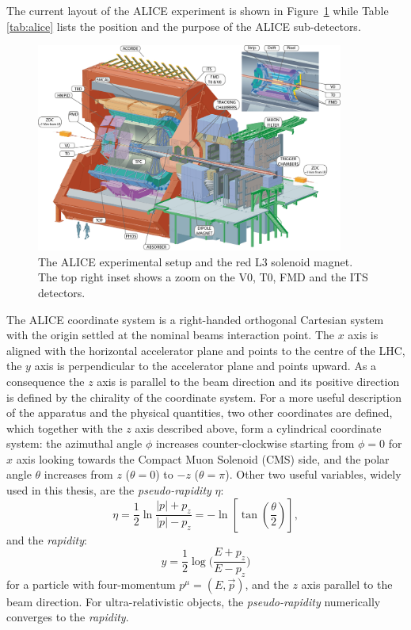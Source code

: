 The current layout of the ALICE experiment is shown in Figure~\ref{fig:alice3D} while Table 
\ref{tab:alice} lists the position and the purpose of the ALICE sub-detectors.
\begin{figure}
    \centering
    \includegraphics[width=0.9\textwidth]{gfx/alice3D}
	\caption{The ALICE experimental setup and the red L3 solenoid magnet. The top right inset shows a zoom on the V0, T0, FMD and the ITS detectors.}
	\label{fig:alice3D}
\end{figure}
The ALICE coordinate system is a right-handed orthogonal Cartesian system with the origin settled at
the nominal beams interaction point.
The $x$ axis is aligned with the horizontal accelerator plane and points to the centre of the LHC,
the $y$ axis is perpendicular to the accelerator plane and points upward.
As a consequence the $z$ axis is parallel to the beam direction and its positive direction is 
defined by the chirality of the coordinate system. 
For a more useful description of the apparatus and the physical quantities, two other coordinates
are defined, which together with the $z$ axis described above, form a cylindrical coordinate system:
the azimuthal angle $\phi$ increases counter-clockwise starting from $\phi = 0$ for $x$ axis looking
towards the Compact Muon Solenoid (CMS) side, and the polar angle $\theta$ increases from $z$ ($\theta=0$) to $-z$ 
($\theta=\pi$).
Other two useful variables, widely used in this thesis, are the \textit{pseudo-rapidity} $\eta$:
\begin{equation}
    \eta = \frac{1}{2} \ln \frac{|p| + p_{z}}{|p| - p_{z}} =
     - \ln \left[ \tan \left(\frac{\theta}{2} \right) \right],
\end{equation}
and the \textit{rapidity}:
\begin{equation} \label{eq:rapidity}
    y = \frac{1}{2} \log \bigl( \frac{E+p_{z}}{E-p_{z}} \bigr) 
\end{equation}
for a particle with four-momentum $p^{\mu} = (E,\vec{p})$, and the $z$ axis parallel to the beam 
direction.
For ultra-relativistic objects, the \textit{pseudo-rapidity} numerically converges to the 
\textit{rapidity}.

